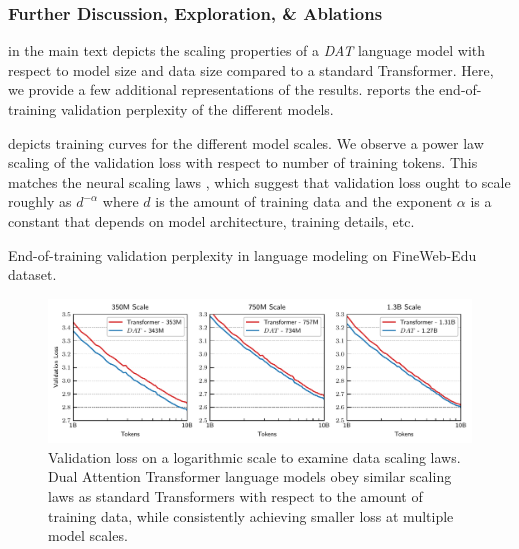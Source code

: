 \subsubsection*{Further Discussion, Exploration, \& Ablations}

 in the main text depicts the scaling properties of a \textit{DAT} language model with respect to model size and data size compared to a standard Transformer. Here, we provide a few additional representations of the results.  reports the end-of-training validation perplexity of the different models. 

 depicts training curves for the different model scales. We observe a power law scaling of the validation loss with respect to number of training tokens. This matches the neural scaling laws \citep{kaplan2020scalinglawsneurallanguage}, which suggest that validation loss ought to scale roughly as $d^{-\alpha}$ where $d$ is the amount of training data and the exponent $\alpha$ is a constant that depends on model architecture, training details, etc.

\begin{table}[h]
    \centering
    \caption{End-of-training validation perplexity in language modeling on FineWeb-Edu dataset.}\label{tab:fineweb_results}
    
\end{table}

\begin{figure}[h]
    \includegraphics[width=\textwidth]{figs/experiments/fineweb/valloss_logtok.pdf}
    \caption{Validation loss on a logarithmic scale to examine data scaling laws. Dual Attention Transformer language models obey similar scaling laws as standard Transformers with respect to the amount of training data, while consistently achieving smaller loss at multiple model scales.}\label{fig:fineweb_training_curves}
\end{figure}



